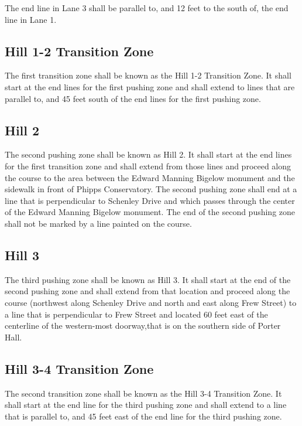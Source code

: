The end line in Lane 3 shall be parallel to, and 12 feet to the south of, the end line in Lane 1.

\subsection{Hill 1-2 Transition Zone}

The first transition zone shall be known as the Hill 1-2 Transition Zone. It shall start at the end lines for the first pushing zone and shall extend to lines that are parallel to, and 45 feet south of the end lines for the first pushing zone.

\subsection{Hill 2}

The second pushing zone shall be known as Hill 2. It shall start at the end lines for the first transition zone and shall extend from those lines and proceed along the course to the area between the Edward Manning Bigelow monument and the sidewalk in front of Phipps Conservatory. The second pushing zone shall end at a line that is perpendicular to Schenley Drive and which passes through the center of the Edward Manning Bigelow monument. The end of the second pushing zone shall not be marked by a line painted on the course.

\subsection{Hill 3}

The third pushing zone shall be known as Hill 3. It shall start at the end of the second pushing zone and shall extend from that location and proceed along the course (northwest along Schenley Drive and north and east along Frew Street) to a line that is perpendicular to Frew Street and located 60 feet east of the centerline of the western-most doorway,that is on the southern side of Porter Hall.

\subsection{Hill 3-4 Transition Zone}

The second transition zone shall be known as the Hill 3-4 Transition Zone. It shall start at the end line for the third pushing zone and shall extend to a line that is parallel to, and 45 feet east of the end line for the third pushing zone.

